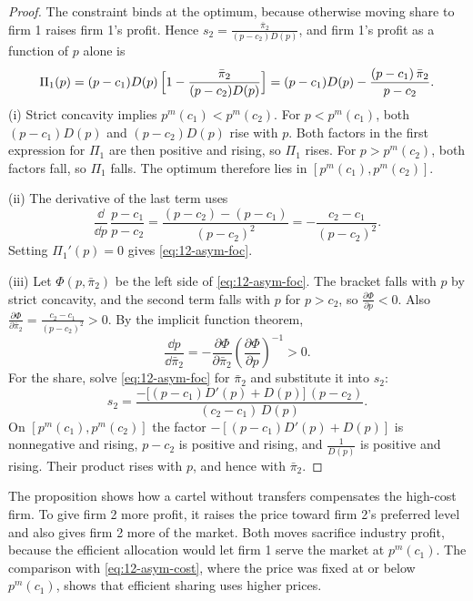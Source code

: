 \begin{proof}
The constraint binds at the optimum, because otherwise moving share to firm 1 raises firm 1's profit. Hence
$s_2 = \frac{\bar\pi_2}{(p - c_2)D(p)}$, and firm 1's profit as a function of $p$ alone is
\begin{equation*}
\Pi_1(p) = (p - c_1)D(p)\,\Bigl[1 - \frac{\bar\pi_2}{(p - c_2)D(p)}\Bigr]
= (p - c_1)D(p) - \frac{(p - c_1)\,\bar\pi_2}{p - c_2} .
\end{equation*}
(i) Strict concavity implies $p^m(c_1) < p^m(c_2)$. For $p < p^m(c_1)$, both $(p - c_1)D(p)$ and $(p - c_2)D(p)$ rise
with $p$. Both factors in the first expression for $\Pi_1$ are then positive and rising, so $\Pi_1$ rises. For
$p > p^m(c_2)$, both factors fall, so $\Pi_1$ falls. The optimum therefore lies in $[p^m(c_1), p^m(c_2)]$.

(ii) The derivative of the last term uses
\begin{equation*}
\frac{\dd}{\dd p}\,\frac{p - c_1}{p - c_2} = \frac{(p - c_2) - (p - c_1)}{(p - c_2)^2} = -\frac{c_2 - c_1}{(p - c_2)^2} .
\end{equation*}
Setting $\Pi_1'(p) = 0$ gives \eqref{eq:12-asym-foc}.

(iii) Let $\Phi(p, \bar\pi_2)$ be the left side of \eqref{eq:12-asym-foc}. The bracket falls with $p$ by strict
concavity, and the second term falls with $p$ for $p > c_2$, so $\frac{\partial\Phi}{\partial p} < 0$. Also
$\frac{\partial\Phi}{\partial\bar\pi_2} = \frac{c_2 - c_1}{(p - c_2)^2} > 0$. By the implicit function theorem,
\begin{equation*}
\frac{\dd p}{\dd\bar\pi_2} = -\frac{\partial\Phi}{\partial\bar\pi_2}\left(\frac{\partial\Phi}{\partial p}\right)^{-1} > 0 .
\end{equation*}
For the share, solve \eqref{eq:12-asym-foc} for $\bar\pi_2$ and substitute it into $s_2$:
\begin{equation*}
s_2 = \frac{-\bigl[(p - c_1)D'(p) + D(p)\bigr]\,(p - c_2)}{(c_2 - c_1)\,D(p)} .
\end{equation*}
On $[p^m(c_1), p^m(c_2)]$ the factor $-[(p - c_1)D'(p) + D(p)]$ is nonnegative and rising, $p - c_2$ is positive and
rising, and $\frac{1}{D(p)}$ is positive and rising. Their product rises with $p$, and hence with $\bar\pi_2$.
\end{proof}

The proposition shows how a cartel without transfers compensates the high-cost firm. To give firm 2 more profit, it
raises the price toward firm 2's preferred level and also gives firm 2 more of the market. Both moves sacrifice
industry profit, because the efficient allocation would let firm 1 serve the market at $p^m(c_1)$. The comparison with
\eqref{eq:12-asym-cost}, where the price was fixed at or below $p^m(c_1)$, shows that efficient sharing uses higher
prices.

